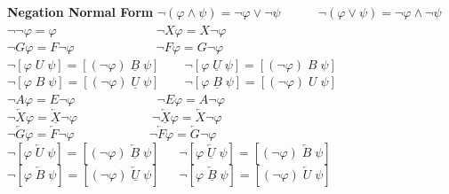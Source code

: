 \documentclass{article}
\begin{document}
\begin{multicols}{4}
\textbf{Negation Normal Form}
${\neg( \varphi \wedge \psi ) = \neg \varphi \vee \neg \psi} \qquad\quad {\neg( \varphi \vee \psi ) = \neg \varphi \wedge \neg \psi }$ \\
${\neg \neg \varphi = \varphi} \qquad\qquad\qquad\qquad  {\neg X \varphi = X \neg \varphi}$ \\
${\neg G \varphi = F \neg \varphi}\qquad\qquad\qquad\;\;{\neg F \varphi = G \neg \varphi}$\\
${\neg[\varphi \; U \;\psi] = [ (\neg \varphi) \;\underline{B}\; \psi ]}\qquad  {\neg[\varphi\; \underline{U}\; \psi] = [ (\neg \varphi)\; B \;\psi ]}$\\
${\neg[\varphi \; B \;\psi] = [ (\neg \varphi) \;\underline{U}\; \psi ]}\qquad  {\neg[\varphi\; \underline{B}\; \psi] = [ (\neg \varphi)\; U\; \psi ]}$\\
${\neg A \varphi = E \neg \varphi} \qquad\qquad\qquad\;\;  {\neg E \varphi = A \neg \varphi}$ \\
${\neg \overleftarrow{X} \varphi = \underline{\overleftarrow{X}} \neg \varphi } \qquad\qquad\qquad  {\neg \underline{\overleftarrow{X}} \varphi = \overleftarrow{X} \neg \varphi }$\\
${\neg \overleftarrow{G} \varphi = \overleftarrow{F} \neg \varphi } \qquad\qquad\qquad {\neg \overleftarrow{F} \varphi = \overleftarrow{G} \neg \varphi }$\\
${\neg[\varphi \;\overleftarrow{U} \;\psi] = [ (\neg \varphi) \;\overleftarrow{\underline{B}}\; \psi ]}\quad\;\; {\neg[\varphi\; \overleftarrow{\underline{U}}\; \psi] = [ (\neg \varphi)\; \overleftarrow{B} \; \psi ]}$\\
${\neg[\varphi \;\overleftarrow{B} \;\psi] = [ (\neg \varphi) \;\overleftarrow{\underline{U}}\; \psi ]}\quad\;\; {\neg[\varphi\; \overleftarrow{\underline{B}}\; \psi] = [ (\neg \varphi)\; \overleftarrow{U} \; \psi ]}$\\


\end{multicols}
\end{document}
